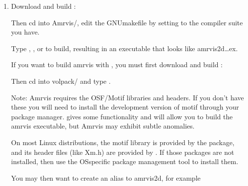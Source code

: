 \documentclass[letterpaper,10pt,english]{sphinxmanual}
\begin{document}
\begin{enumerate}
%
\item {} 
\sphinxAtStartPar
Download and build :

\begin{sphinxVerbatim}[commandchars=\\\{\}]
\end{sphinxVerbatim}

\sphinxAtStartPar
Then cd into Amrvis/, edit the GNUmakefile by setting  to the
compiler suite you have.

\sphinxAtStartPar
Type , , or  to build, resulting
in an executable that looks like amrvis2d…ex.

\sphinxAtStartPar
If you want to build amrvis with , you must first download and build
:

\begin{sphinxVerbatim}[commandchars=\\\{\}]
\end{sphinxVerbatim}

\sphinxAtStartPar
Then cd into volpack/ and type .

\sphinxAtStartPar
Note: Amrvis requires the OSF/Motif libraries and headers. If you don’t have
these you will need to install the development version of motif through your
package manager.   gives some functionality and will allow you to
build the amrvis executable, but Amrvis may exhibit subtle anomalies.

\sphinxAtStartPar
On most Linux distributions, the motif library is provided by the
 package, and its header files (like Xm.h) are provided by
. If those packages are not installed, then use the
OS\sphinxhyphen{}specific package management tool to install them.

\sphinxAtStartPar
You may then want to create an alias to amrvis2d, for example

\begin{sphinxVerbatim}[commandchars=\\\{\}]
\end{sphinxVerbatim}


\end{enumerate}
\end{document}
